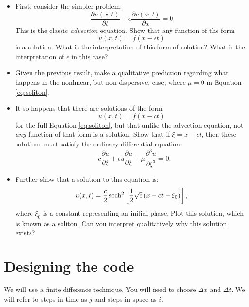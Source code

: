 \documentclass[11pt, preprint]{aastex}
\begin{document}
\begin{itemize}
\item First, consider the simpler problem:
  \begin{equation}
   \frac{\partial u(x,t)}{\partial t} + \epsilon \frac{\partial
     u(x,t)}{\partial x} = 0
  \end{equation}
This is the classic {\it advection} equation. Show that any function
of the form
   \begin{equation}
     u(x,t) = f(x- \epsilon t) 
   \end{equation}
is a solution. What is the interpretation of this form of solution?
What is the interpretation of $\epsilon$ in this case?
\item Given the previous result, make a qualitative prediction
  regarding what happens in the nonlinear, but non-dispersive, case,
  where $\mu = 0$ in Equation \ref{eq:soliton}.
\item It so happens that there are solutions of the form 
   \begin{equation}
     u(x,t) = f(x- c t) 
   \end{equation}
   for the full Equation \ref{eq:soliton}, but that unlike the
   advection equation, not {\it any} function of that form is a
   solution. Show that if $\xi = x - c t$, then these solutions must
   satisfy the ordinary differential equation:
   \begin{equation}
      - c \frac{\partial u}{\partial \xi} + \epsilon u \frac{\partial
        u}{\partial \xi} + \mu \frac{\partial^3 u}{\partial \xi^3} = 0.
   \end{equation}
 \item Further show that a solution to this equation is:
   \begin{equation}
    u(x,t) = \frac{c}{2} \operatorname{sech}^2\left[\frac{1}{2} \sqrt{c} \left(x-
      ct - \xi_0\right) \right],
   \end{equation}
   where $\xi_0$ is a constant representing an initial phase.  Plot
   this solution, which is known as a soliton. Can you interpret
   qualitatively why this solution exists?
\end{itemize}

\section{Designing the code}

We will use a finite difference technique. You will need to choose
$\Delta x$ and $\Delta t$. We will refer to steps in time as $j$ and
steps in space as $i$.
\end{document}
